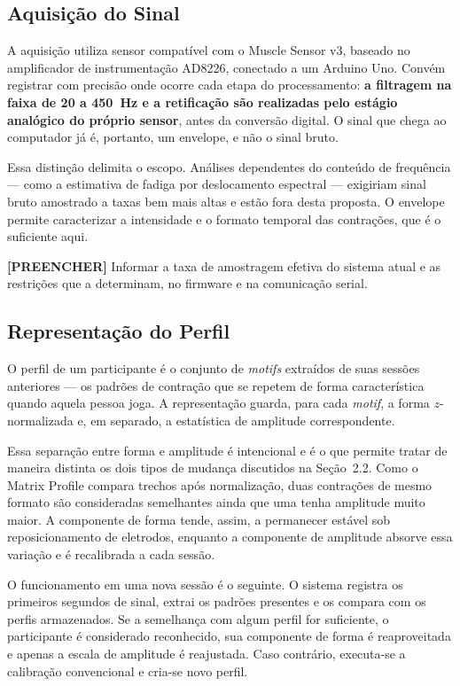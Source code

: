 \subsection{Aquisição do Sinal}

A aquisição utiliza sensor compatível com o Muscle Sensor v3, baseado
no amplificador de instrumentação AD8226, conectado a um Arduino Uno.
Convém registrar com precisão onde ocorre cada etapa do processamento:
\textbf{a filtragem na faixa de 20 a 450~Hz e a retificação são
realizadas pelo estágio analógico do próprio sensor}, antes da
conversão digital. O sinal que chega ao computador já é, portanto, um
envelope, e não o sinal bruto.

Essa distinção delimita o escopo. Análises dependentes do conteúdo de
frequência --- como a estimativa de fadiga por deslocamento espectral
--- exigiriam sinal bruto amostrado a taxas bem mais altas e estão fora
desta proposta. O envelope permite caracterizar a intensidade e o
formato temporal das contrações, que é o suficiente aqui.

\textbf{[PREENCHER]} Informar a taxa de amostragem efetiva do sistema
atual e as restrições que a determinam, no firmware e na comunicação
serial.

\subsection{Representação do Perfil}

O perfil de um participante é o conjunto de \textit{motifs} extraídos
de suas sessões anteriores --- os padrões de contração que se repetem
de forma característica quando aquela pessoa joga. A representação
guarda, para cada \textit{motif}, a forma $z$-normalizada e, em
separado, a estatística de amplitude correspondente.

Essa separação entre forma e amplitude é intencional e é o que permite
tratar de maneira distinta os dois tipos de mudança discutidos na
Seção~2.2. Como o Matrix Profile compara trechos após normalização,
duas contrações de mesmo formato são consideradas semelhantes ainda que
uma tenha amplitude muito maior. A componente de forma tende, assim, a
permanecer estável sob reposicionamento de eletrodos, enquanto a
componente de amplitude absorve essa variação e é recalibrada a cada
sessão.

O funcionamento em uma nova sessão é o seguinte. O sistema registra os
primeiros segundos de sinal, extrai os padrões presentes e os compara
com os perfis armazenados. Se a semelhança com algum perfil for
suficiente, o participante é considerado reconhecido, sua componente de
forma é reaproveitada e apenas a escala de amplitude é reajustada. Caso
contrário, executa-se a calibração convencional e cria-se novo perfil.


